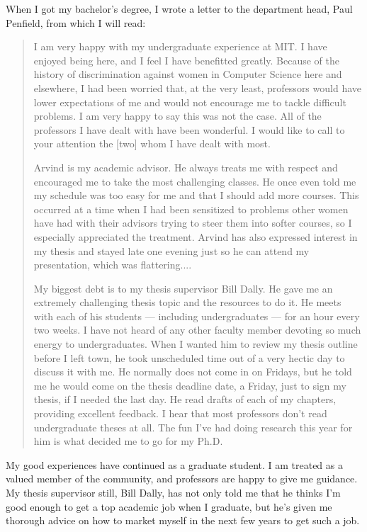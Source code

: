 When I got my bachelor's degree, I wrote a letter to the department
head, Paul Penfield, from which I will read:
\begin{quotation}
I am very happy with my undergraduate experience at MIT.  I have
enjoyed being here, and I feel I have benefitted greatly.  Because of
the history of discrimination against women in Computer Science here
and elsewhere, I had been worried that, at the very least, professors
would have lower expectations of me and would not encourage me to
tackle difficult problems.  I am very happy to say this was not the
case.  All of the professors I have dealt with have been wonderful.  I
would like to call to your attention the [two] whom I have dealt with
most.

Arvind is my academic advisor.  He always treats me with respect and
encouraged me to take the most challenging classes.  He once even told
me my schedule was too easy for me and that I should add more courses.
This occurred at a time when I had been sensitized to problems other
women have had with their advisors trying to steer them into softer
courses, so I especially appreciated the treatment.  Arvind has also
expressed interest in my thesis and stayed late one evening just so
he can attend my presentation, which was flattering....

My biggest debt is to my thesis supervisor Bill Dally.  He gave me an
extremely challenging thesis topic and the resources to do it.  He
meets with each of his students --- including undergraduates --- for
an hour every two weeks.  I have not heard of any other faculty member
devoting so much energy to undergraduates.  When I wanted him to
review my thesis outline before I left town, he took unscheduled time
out of a very hectic day to discuss it with me.  He normally does not
come in on Fridays, but he told me he would come on the thesis
deadline date, a Friday, just to sign my thesis, if I needed the last
day.  He  read drafts of each of my chapters, providing
excellent feedback.  I hear that most professors don't read
undergraduate theses at all.  The fun I've had doing research this
year for him is what decided me to go for my Ph.D.  
\end{quotation}

My good experiences have continued as a graduate student.  I am
treated as a valued member of the community, and professors are happy
to give me guidance.  My thesis supervisor still, Bill Dally, has not
only told me that he thinks I'm good enough to get a top academic job
when I graduate, but he's given me thorough advice on how to market
myself in the next few years to get such a job.

